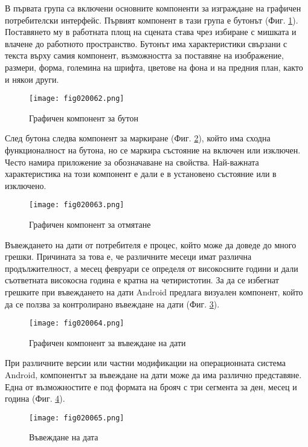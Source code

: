 В първата група са включени основните компоненти за изграждане на графичен потребителски интерфейс. Първият компонент в тази група е бутонът (Фиг. \ref{fig020062}). Поставянето му в работната площ на сцената става чрез избиране с мишката и влачене до работното пространство. Бутонът има характеристики свързани с текста върху самия компонент, възможността за поставяне на изображение, размери, форма, големина на шрифта, цветове на фона и на предния план, както и някои други.

\begin{figure}[H]
  \centering
  \texttt{[image: fig020062.png]}
  \caption{Графичен компонент за бутон}
\label{fig020062}
\end{figure}

След бутона следва компонент за маркиране (Фиг. \ref{fig020063}), който има сходна функционалност на бутона, но се маркира състояние на включен или изключен. Често намира приложение за обозначаване на свойства. Най-важната характеристика на този компонент е дали е в установено състояние или в изключено. 

\begin{figure}[H]
  \centering
  \texttt{[image: fig020063.png]}
  \caption{Графичен компонент за отмятане}
\label{fig020063}
\end{figure}

Въвеждането на дати от потребителя е процес, който може да доведе до много грешки. Причината за това е, че различните месеци имат различна продължителност, а месец февруари се определя от високосните години и дали съответната високосна година е кратна на четиристотин. За да се избегнат грешките при въвеждането на дати Android предлага визуален компонент, който да се ползва за контролирано въвеждане на дати (Фиг. \ref{fig020064}).

\begin{figure}[H]
  \centering
  \texttt{[image: fig020064.png]}
  \caption{Графичен компонент за въвеждане на дати}
\label{fig020064}
\end{figure}

При различните версии или частни модификации на операционната система Android, компонентът за въвеждане на дати може да има различно представяне. Една от възможностите е под формата на брояч с три сегмента за ден, месец и година (Фиг. \ref{fig020065}).

\begin{figure}[H]
  \centering
  \texttt{[image: fig020065.png]}
  \caption{Въвеждане на дата}
\label{fig020065}
\end{figure}

